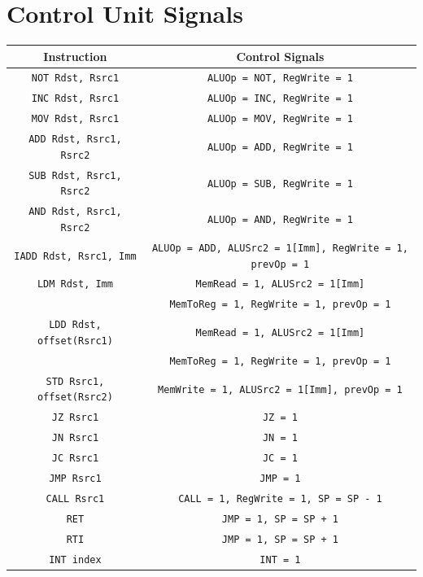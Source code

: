 \documentclass{report}
\begin{document}
\section*{Control Unit Signals}
\begin{table}[H]
    \centering
    \begin{tabular}{|c|c|}
    \hline
    \textbf{Instruction} & \textbf{Control Signals} \\ \hline
    \texttt{NOT Rdst, Rsrc1} & \texttt{ALUOp = NOT, RegWrite = 1} \\ \hline
    \texttt{INC Rdst, Rsrc1} & \texttt{ALUOp = INC, RegWrite = 1} \\ \hline
    \texttt{MOV Rdst, Rsrc1} & \texttt{ALUOp = MOV, RegWrite = 1} \\ \hline
    \texttt{ADD Rdst, Rsrc1, Rsrc2} & \texttt{ALUOp = ADD, RegWrite = 1} \\ \hline
    \texttt{SUB Rdst, Rsrc1, Rsrc2} & \texttt{ALUOp = SUB, RegWrite = 1} \\ \hline
    \texttt{AND Rdst, Rsrc1, Rsrc2} & \texttt{ALUOp = AND, RegWrite = 1} \\ \hline
    \texttt{IADD Rdst, Rsrc1, Imm} & \texttt{ALUOp = ADD, ALUSrc2 = 1[Imm], RegWrite = 1, prevOp = 1} \\ \hline
    \texttt{LDM Rdst, Imm} & \texttt{MemRead = 1, ALUSrc2 = 1[Imm]} \\ \texttt{} & \texttt{MemToReg = 1, RegWrite = 1, prevOp = 1} \\ \hline
    \texttt{LDD Rdst, offset(Rsrc1)} & \texttt{MemRead = 1, ALUSrc2 = 1[Imm]} \\ \texttt{} & \texttt{MemToReg = 1, RegWrite = 1, prevOp = 1} \\ \hline
    \texttt{STD Rsrc1, offset(Rsrc2)} & \texttt{MemWrite = 1, ALUSrc2 = 1[Imm], prevOp = 1} \\ \hline
    \texttt{JZ Rsrc1} & \texttt{JZ = 1} \\ \hline
    \texttt{JN Rsrc1} & \texttt{JN = 1} \\ \hline
    \texttt{JC Rsrc1} & \texttt{JC = 1} \\ \hline
    \texttt{JMP Rsrc1} & \texttt{JMP = 1} \\ \hline
    \texttt{CALL Rsrc1} & \texttt{CALL = 1, RegWrite = 1, SP = SP - 1} \\ \hline
    \texttt{RET} & \texttt{JMP = 1, SP = SP + 1} \\ \hline
    \texttt{RTI} & \texttt{JMP = 1, SP = SP + 1} \\ \hline
    \texttt{INT index} & \texttt{INT = 1} \\ \hline

\end{tabular}
\end{table}
\end{document}
